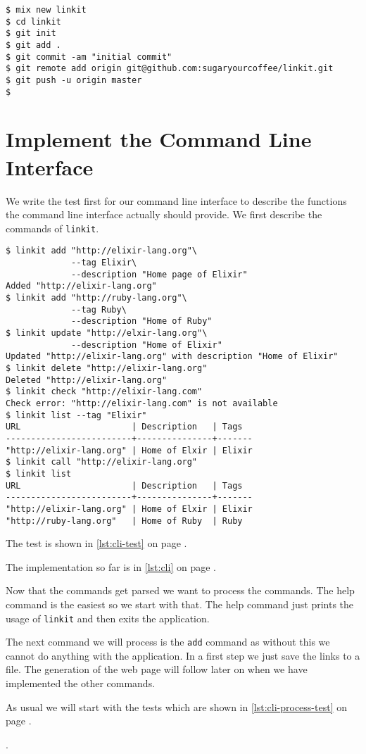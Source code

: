 \documentclass[10pt, a4paper]{article}
\newcommand{\includecode}[3]{}
\begin{document}
\begin{verbatim}
$ mix new linkit
$ cd linkit
$ git init
$ git add .
$ git commit -am "initial commit"
$ git remote add origin git@github.com:sugaryourcoffee/linkit.git
$ git push -u origin master
$
\end{verbatim}

\section{Implement the Command Line Interface}
We write the test first for our command line interface to describe the
functions the command line interface actually should provide. We first 
describe the commands of \texttt{linkit}.

\begin{verbatim}
$ linkit add "http://elixir-lang.org"\
             --tag Elixir\
             --description "Home page of Elixir"
Added "http://elixir-lang.org"
$ linkit add "http://ruby-lang.org"\
             --tag Ruby\
             --description "Home of Ruby"
$ linkit update "http://elxir-lang.org"\
             --description "Home of Elixir"
Updated "http://elixir-lang.org" with description "Home of Elixir"
$ linkit delete "http://elixir-lang.org"
Deleted "http://elixir-lang.org"
$ linkit check "http://elixir-lang.com"
Check error: "http://elixir-lang.com" is not available
$ linkit list --tag "Elixir"
URL                      | Description   | Tags
-------------------------+---------------+-------
"http://elixir-lang.org" | Home of Elxir | Elixir
$ linkit call "http://elixir-lang.org"
$ linkit list
URL                      | Description   | Tags
-------------------------+---------------+-------
"http://elixir-lang.org" | Home of Elxir | Elixir
"http://ruby-lang.org"   | Home of Ruby  | Ruby   
\end{verbatim}

The test is shown in \ref{lst:cli-test} on page \pageref{lst:cli-test}.

\includecode{test/cli\_test.exs}{lst:cli-test}{files/cli_test.exs}

The implementation so far is in \ref{lst:cli} on page \pageref{lst:cli}.

\includecode{lib/linkit/cli.ex}{lst:cli}{files/cli.ex}

Now that the commands get parsed we want to process the commands. The help 
command is the easiest so we start with that. The help command just prints
the usage of \texttt{linkit} and then exits the application.

The next command we will process is the \texttt{add} command as without this
we cannot do anything with the application. In a first step we just save the
links to a file. The generation of the web page will follow later on when we
have implemented the other commands.

As usual we will start with the tests which are shown in 
\ref{lst:cli-process-test} on page \pageref{lst:cli-process-test}.

\includecode{test/cli\_process\_test.exs}{lst:cli-process-test}
            {files/cli_process_test.exs}.
\end{document}
